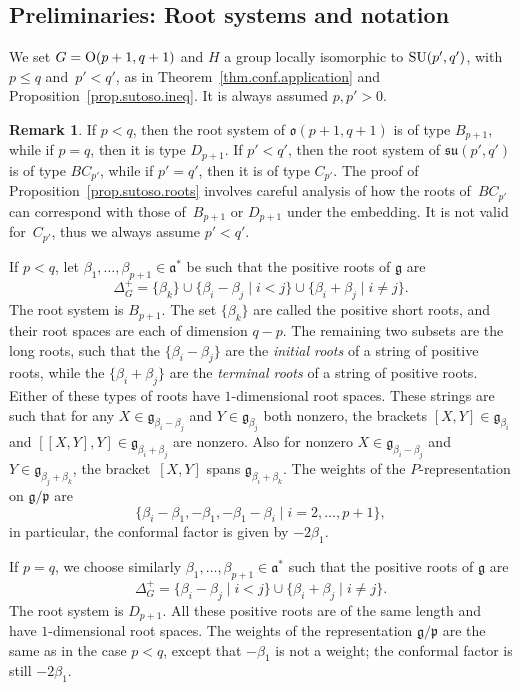\documentclass[10pt,a4paper]{amsart}
\numberwithin{equation}{section}
\theoremstyle{definition}
\newtheorem{rem}[thm]{Remark}
\newcommand{\lieg}{\mathfrak{g}}
\def\g{{\mathfrak g}}
\def\p{{\mathfrak p}}
\def\a{{\mathfrak a}}
\def\lieo{{\mathfrak o}}
\begin{document}
\subsection{Preliminaries: Root systems and notation}

We set $G = {\rm O}(p+1,q+1)$ and $H$ a group locally isomorphic to ${\rm SU}(p',q')$, with $p\leq q$ and~${p' < q'}$, as in Theorem~\ref{thm.conf.application} and Proposition~\ref{prop.sutoso.ineq}. It is always assumed $p, p' > 0$.

\begin{rem}
If $p<q$, then the root system of $\lieo(p+1,q+1)$ is of type $B_{p+1}$, while if $p=q$, then it is type $D_{p+1}$. If $p'<q'$, then the root system of $\mathfrak{su}(p',q')$ is of type $BC_{p'}$, while if $p'=q'$, then it is of type $C_{p'}$. The proof of Proposition~\ref{prop.sutoso.roots} involves careful analysis of how the roots of~$BC_{p'}$ can correspond with those of~$B_{p+1}$ or $D_{p+1}$ under the embedding. It is not valid for~$C_{p'}$, thus we always assume $p' < q'$.
\end{rem}


If $p<q$, let $\beta_1, \dots, \beta_{p+1} \in \a^*$ be such that the positive roots of $\lieg$ are
\[ \Delta^+_G = \{ \beta_k \} \cup \{ \beta_i - \beta_j \mid i < j \} \cup \{ \beta_i + \beta_j \mid i \neq j\}.\]
The root system is $B_{p+1}$.
The set $\{ \beta_k \}$ are called the positive short roots, and their root spaces are each of dimension $q-p$. The remaining two subsets are the long roots, such that the $\{ \beta_i - \beta_j \}$ are the \emph{initial roots} of a string of positive roots, while the $\{ \beta_i + \beta_j \}$ are the \emph{terminal roots} of a string of positive roots. Either of these types of roots have $1$-dimensional root spaces. These strings are such that for any $X \in \g_{\beta_i - \beta_j}$ and $Y \in \g_{\beta_j}$ both nonzero, the brackets $[X,Y] \in \g_{\beta_i}$ and $[[X,Y],Y] \in \g_{\beta_i + \beta_j}$ are nonzero. Also for nonzero $X \in \g_{\beta_i - \beta_j}$ and~$Y \in \g_{\beta_j + \beta_k}$, the bracket~$[X,Y]$ spans $\g_{\beta_i + \beta_k}$.
 The weights of the $P$-representation on $\lieg/ \p$ are
\[\{ \beta_i - \beta_1, - \beta_1, - \beta_1 - \beta_i \mid i =2, \dots, p+1 \},\]
in particular, the conformal factor is given by $- 2 \beta_1$.

If $p=q$, we choose similarly $\beta_1, \dots, \beta_{p+1} \in \a^*$ such that the positive roots of $\lieg$ are
\[ \Delta^+_G = \{ \beta_i - \beta_j \mid i < j \} \cup \{ \beta_i + \beta_j \mid i \neq j\}.\]
The root system is $D_{p+1}$. All these positive roots are of the same length and have $1$-dimensional root spaces. The weights of the representation $\lieg/ \p$ are the same as in the case $p<q$, except that $-\beta_1$ is not a weight; the conformal factor is still $- 2 \beta_1$.
\end{document}

